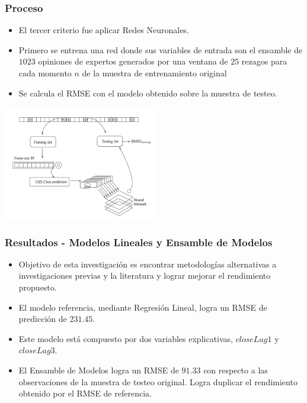 \documentclass{beamer}
\begin{document}
\begin{frame}[t]
\frametitle{Proceso}
\vfill
\begin{itemize}
\item
El tercer criterio fue aplicar Redes Neuronales. 
\item
Primero se entrena una red donde sus variables de entrada son el ensamble de $1023$ opiniones de expertos generados por una ventana de $25$ rezagos para cada momento $n$ de la muestra de entrenamiento original
\item
Se calcula el RMSE con el modelo obtenido sobre la muestra de testeo. 
\end{itemize}
\vfill
\centering
\includegraphics[width=0.5\textwidth]{diagramNeuralNetwork}
\end{frame}

\begin{frame}[t]
\frametitle{Resultados - Modelos Lineales y Ensamble de Modelos}
\vfill
\begin{itemize}
\item
Objetivo de esta investigación es encontrar metodologías alternativas a investigaciones previas y la literatura y lograr mejorar el rendimiento propuesto. 
\item
El modelo referencia, mediante Regresión Lineal, logra un RMSE de predicción de  $231.45$.
\item
Este modelo está compuesto por dos variables explicativas, $closeLag1$ y $closeLag3$.
\item
El Ensamble de Modelos logra un RMSE de $91.33$ con respecto a las observaciones de la muestra de testeo original. Logra duplicar el rendimiento obtenido por el RMSE de referencia. 
\end{itemize}
\end{frame}
\end{document}
